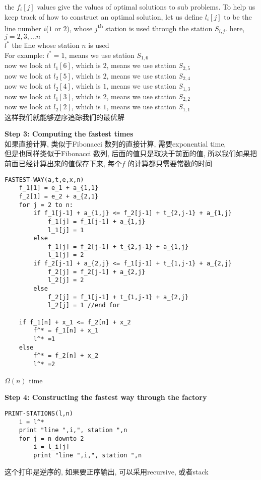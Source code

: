 \documentclass{article}
\begin{document}
\noindent
the $f_i[j]$ values give the values of optimal solutions to sub problems. To help us keep track of how to construct an optimal solution, let us define $l_i[j]$ to be the line number $i$($1$ or $2$), whose $j$\textsuperscript{th} station is used through the station $S_{i,j}$. here, $j=2,3,… n$\\
$l^*$ the line whose station $n$ is used\\
For example: $l^* = 1$, means we use station $S_{1,6}$\\
now we look at $l_1[6]$, which is $2$, means we use station $S_{2,5}$\\
now we look at $l_2[5]$, which is $2$, means we use station $S_{2,4}$\\
now we look at $l_2[4]$, which is $1$, means we use station $S_{1,3}$\\
now we look at $l_1[3]$, which is $2$, means we use station $S_{2,2}$\\
now we look at $l_2[2]$, which is $1$, means we use station $S_{1,1}$\\
这样我们就能够逆序追踪我们的最优解

\textbf{Step 3: Computing the fastest times}\\
如果直接计算, 类似于Fibonacci 数列的直接计算, 需要exponential time,\\
但是也同样类似于Fibonacci 数列, 后面的值只是取决于前面的值, 所以我们如果把前面已经计算出来的值保存下来, 每个$f$ 的计算都只需要常数的时间

\begin{verbatim}
FASTEST-WAY(a,t,e,x,n)
    f_1[1] = e_1 + a_{1,1}
    f_2[1] = e_2 + a_{2,1}
    for j = 2 to n:
        if f_1[j-1] + a_{1,j} <= f_2[j-1] + t_{2,j-1} + a_{1,j}
            f_1[j] = f_1[j-1] + a_{1,j}
            l_1[j] = 1
        else
            f_1[j] = f_2[j-1] + t_{2,j-1} + a_{1,j}
            l_1[j] = 2
        if f_2[j-1] + a_{2,j} <= f_1[j-1] + t_{1,j-1} + a_{2,j}
            f_2[j] = f_2[j-1] + a_{2,j}
            l_2[j] = 2
        else
            f_2[j] = f_1[j-1] + t_{1,j-1} + a_{2,j}
            l_2[j] = 1 //end for

    if f_1[n] + x_1 <= f_2[n] + x_2
        f^* = f_1[n] + x_1
        l^* =1
    else
        f^* = f_2[n] + x_2
        l^* =2
\end{verbatim}

\noindent
$\Omega(n)$ time

\textbf{Step 4: Constructing the fastest way through the factory}
\begin{verbatim}
PRINT-STATIONS(l,n)
    i = l^*
    print "line ",i,", station ",n
    for j = n downto 2
        i = l_i[j]
        print "line ",i,", station ",n
\end{verbatim}
这个打印是逆序的, 如果要正序输出, 可以采用recursive, 或者stack
\end{document}
